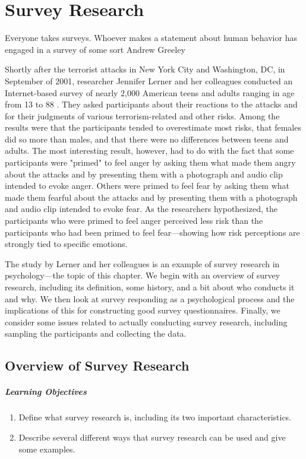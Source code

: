 \chapter{Survey Research}

Everyone takes surveys. Whoever makes a statement about human behavior has engaged in a survey of some sort
Andrew Greeley

Shortly after the terrorist attacks in New York City and Washington, DC, in September of 2001, researcher Jennifer Lerner and her colleagues conducted an Internet-based survey of nearly 2,000 American teens and adults ranging in age from 13 to 88 \citep{lerner_effects_2003}. They asked participants about their reactions to the attacks and for their judgments of various terrorism-related and other risks. Among the results were that the participants tended to overestimate most risks, that females did so more than males, and that there were no differences between teens and adults. The most interesting result, however, had to do with the fact that some participants were "primed" to feel anger by asking them what made them angry about the attacks and by presenting them with a photograph and audio clip intended to evoke anger. Others were primed to feel fear by asking them what made them fearful about the attacks and by presenting them with a photograph and audio clip intended to evoke fear. As the researchers hypothesized, the participants who were primed to feel anger perceived less risk than the participants who had been primed to feel fear---showing how risk perceptions are strongly tied to specific emotions.

The study by Lerner and her colleagues is an example of survey research in psychology---the topic of this chapter. We begin with an overview of survey research, including its definition, some history, and a bit about who conducts it and why. We then look at survey responding as a psychological process and the implications of this for constructing good survey questionnaires. Finally, we consider some issues related to actually conducting survey research, including sampling the participants and collecting the data.

\section{Overview of Survey Research}

\paragraph{Learning Objectives}
 \begin{enumerate}
 \item  Define what survey research is, including its two important characteristics.
 \item Describe several different ways that survey research can be used and give some examples.

   \end{enumerate}


